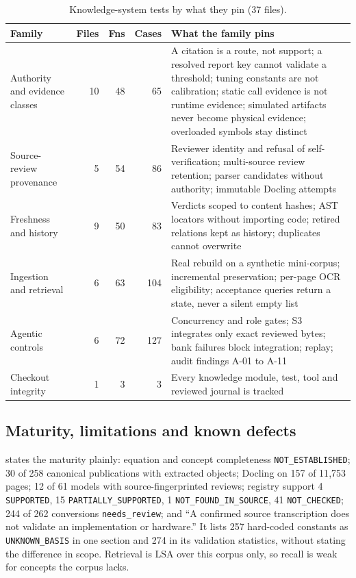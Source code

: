 \begin{table}[H]
\centering\footnotesize
\begin{tabularx}{\linewidth}{P{3.3cm}rrrY}
\toprule
Family & Files & Fns & Cases & What the family pins \\
\midrule
Authority and evidence classes & 10 & 48 & 65 & A citation is a route, not support; a resolved report key cannot validate a threshold; tuning constants are not calibration; static call evidence is not runtime evidence; simulated artifacts never become physical evidence; overloaded symbols stay distinct \\
Source-review provenance & 5 & 54 & 86 & Reviewer identity and refusal of self-verification; multi-source review retention; parser candidates without authority; immutable Docling attempts \\
Freshness and history & 9 & 50 & 83 & Verdicts scoped to content hashes; AST locators without importing code; retired relations kept as history; duplicates cannot overwrite \\
Ingestion and retrieval & 6 & 63 & 104 & Real rebuild on a synthetic mini-corpus; incremental preservation; per-page OCR eligibility; acceptance queries return a state, never a silent empty list \\
Agentic controls & 6 & 72 & 127 & Concurrency and role gates; S3 integrates only exact reviewed bytes; bank failures block integration; replay; audit findings A-01 to A-11 \\
Checkout integrity & 1 & 3 & 3 & Every knowledge module, test, tool and reviewed journal is tracked \\
\bottomrule
\end{tabularx}
\caption{Knowledge-system tests by what they pin (37 files).}\label{tab:kgtests}
\end{table}

\subsection{Maturity, limitations and known defects}
 states the maturity plainly: equation and concept completeness \texttt{NOT\_ESTABLISHED}; 30 of 258 canonical publications with extracted objects; Docling on 157 of 11{,}753 pages; 12 of 61 models with source-fingerprinted reviews; registry support 4 \texttt{SUPPORTED}, 15 \texttt{PARTIALLY\_SUPPORTED}, 1 \texttt{NOT\_FOUND\_IN\_SOURCE}, 41 \texttt{NOT\_CHECKED}; 244 of 262 conversions \texttt{needs\_review}; and ``A confirmed source transcription does not validate an implementation or hardware.'' It lists 257 hard-coded constants as \texttt{UNKNOWN\_BASIS} in one section and 274 in its validation statistics, without stating the difference in scope. Retrieval is LSA over this corpus only, so recall is weak for concepts the corpus lacks.

